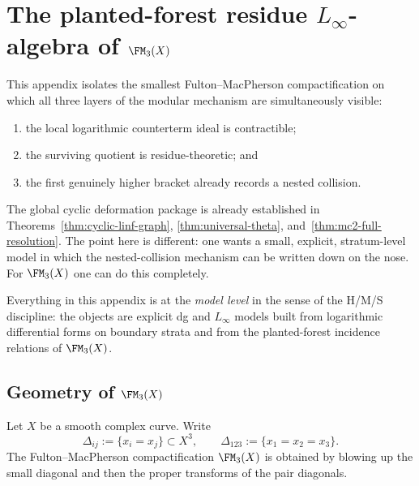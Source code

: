 \chapter{The planted-forest residue \texorpdfstring{$L_\infty$}{L-infinity}-algebra of \texorpdfstring{$\FM_3(X)$}{FM3(X)}}
\label{app:fm3-planted-forest-residue}


This appendix isolates the smallest Fulton--MacPherson compactification on which
all three layers of the modular mechanism are simultaneously visible:
\begin{enumerate}[label=\textup{(\roman*)}]
\item the local logarithmic counterterm ideal is contractible;
\item the surviving quotient is residue-theoretic; and
\item the first genuinely higher bracket already records a nested collision.
\end{enumerate}
The global cyclic deformation package is already established in
Theorems~\ref{thm:cyclic-linf-graph}, \ref{thm:universal-theta},
and~\ref{thm:mc2-full-resolution}.  The point here is different:
one wants a small, explicit, stratum-level model in which the nested-collision
mechanism can be written down on the nose.  For $\FM_3(X)$ one can do this
completely.

Everything in this appendix is at the \emph{model level} in the sense of the
H/M/S discipline: the objects are explicit dg and $L_\infty$ models built from
logarithmic differential forms on boundary strata and from the planted-forest
incidence relations of $\FM_3(X)$.

\section{Geometry of \texorpdfstring{$\FM_3(X)$}{FM3(X)}}
\label{sec:fm3-geometry-residue}

Let $X$ be a smooth complex curve.  Write
\[
\Delta_{ij} := \{x_i = x_j\} \subset X^3,
\qquad
\Delta_{123} := \{x_1 = x_2 = x_3\}.
\]
The Fulton--MacPherson compactification $\FM_3(X)$ is obtained by blowing up the
small diagonal and then the proper transforms of the pair diagonals.

